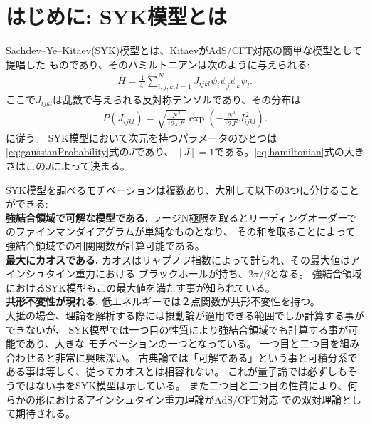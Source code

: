 \section{はじめに: SYK模型とは}
Sachdev--Ye--Kitaev(SYK)模型とは、KitaevがAdS/CFT対応の簡単な模型として提唱した
ものであり、そのハミルトニアンは次のように与えられる:
\begin{align}
  H = \frac{1}{4!}\sum_{i,j,k,l = 1}^{N} J_{ijkl}\psi_i\psi_j\psi_k\psi_l.
  \label{eq:hamiltonian}
\end{align}
ここで$J_{ijkl}$は乱数で与えられる反対称テンソルであり、その分布は
\begin{align}
  P(J_{ijkl}) = \sqrt{\frac{N^3}{12\pi J^2}}
                \exp\left(-\frac{N^3}{12J^2}J_{ijkl}^{\, 2}\right).
	\label{eq:gaussianProbability}
\end{align}
に従う。
SYK模型において次元を持つパラメータのひとつは\eqref{eq:gaussianProbability}式の$J$であり、
$[J] = 1$である。\eqref{eq:hamiltonian}式の大きさはこの$J$によって決まる。

SYK模型を調べるモチベーションは複数あり、大別して以下の3つに分けることができる:\\

\textbf{強結合領域で可解な模型である.}
ラージN極限を取るとリーディングオーダーでのファインマンダイアグラムが単純なものとなり、
その和を取ることによって強結合領域での相関関数が計算可能である。\\

\textbf{最大にカオスである.}
カオスはリャプノフ指数によって計られ、その最大値はアインシュタイン重力における
ブラックホールが持ち、$2\pi / \beta$となる\cite{shenker}。
強結合領域におけるSYK模型もこの最大値を満たす事が知られている\cite{maldacena}。\\

\textbf{共形不変性が現れる.}
低エネルギーでは２点関数が共形不変性を持つ。\\

大抵の場合、理論を解析する際には摂動論が適用できる範囲でしか計算する事ができないが、
SYK模型では一つ目の性質により強結合領域でも計算する事が可能であり、大きな
モチベーションの一つとなっている。
一つ目と二つ目を組み合わせると非常に興味深い。
古典論では「可解である」という事と可積分系である事は等しく、従ってカオスとは相容れない\cite{polchinski}。
これが量子論では必ずしもそうではない事をSYK模型は示している。
また二つ目と三つ目の性質により、何らかの形におけるアインシュタイン重力理論がAdS/CFT対応
での双対理論として期待される。

